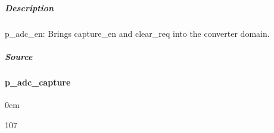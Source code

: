 \documentclass[letterpaper,10pt,english]{sphinxmanual}
\begin{document}
\subparagraph{Description}
\label{\detokenize{modules/sample_capture/processes/p_adc_en:description}}
\sphinxAtStartPar
p\_adc\_en: Brings capture\_en and clear\_req into the converter domain.


\subparagraph{Source}
\label{\detokenize{modules/sample_capture/processes/p_adc_en:source}}
\begin{sphinxVerbatim}[commandchars=\\\{\}]
\end{sphinxVerbatim}

\sphinxstepscope


\paragraph{p\_adc\_capture}
\label{\detokenize{modules/sample_capture/processes/p_adc_capture:p-adc-capture}}\label{\detokenize{modules/sample_capture/processes/p_adc_capture::doc}}
\begin{DUlineblock}{0em}
\item[]  
\item[]  107
\item[]  
\item[]  
\end{DUlineblock}
\end{document}
